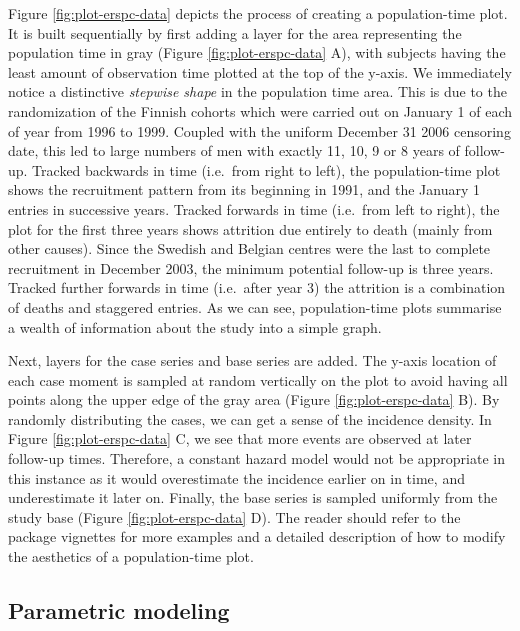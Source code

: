 Figure \ref{fig:plot-erspc-data} depicts the process of creating a
population-time plot. It is built sequentially by first adding a layer
for the area representing the population time in gray (Figure
\ref{fig:plot-erspc-data} A), with subjects having the least amount of
observation time plotted at the top of the y-axis. We immediately notice
a distinctive \emph{stepwise shape} in the population time area. This is
due to the randomization of the Finnish cohorts which were carried out
on January 1 of each of year from 1996 to 1999. Coupled with the uniform
December 31 2006 censoring date, this led to large numbers of men with
exactly 11, 10, 9 or 8 years of follow-up. Tracked backwards in time
(i.e.~from right to left), the population-time plot shows the
recruitment pattern from its beginning in 1991, and the January 1
entries in successive years. Tracked forwards in time (i.e.~from left to
right), the plot for the first three years shows attrition due entirely
to death (mainly from other causes). Since the Swedish and Belgian
centres were the last to complete recruitment in December 2003, the
minimum potential follow-up is three years. Tracked further forwards in
time (i.e.~after year 3) the attrition is a combination of deaths and
staggered entries. As we can see, population-time plots summarise a
wealth of information about the study into a simple graph.

Next, layers for the case series and base series are added. The y-axis
location of each case moment is sampled at random vertically on the plot
to avoid having all points along the upper edge of the gray area (Figure
\ref{fig:plot-erspc-data} B). By randomly distributing the cases, we can
get a sense of the incidence density. In Figure
\ref{fig:plot-erspc-data} C, we see that more events are observed at
later follow-up times. Therefore, a constant hazard model would not be
appropriate in this instance as it would overestimate the incidence
earlier on in time, and underestimate it later on. Finally, the base
series is sampled uniformly from the study base (Figure
\ref{fig:plot-erspc-data} D). The reader should refer to the package
vignettes for more examples and a detailed description of how to modify
the aesthetics of a population-time plot.

\hypertarget{parametric-modeling}{%
\subsection{Parametric modeling}\label{parametric-modeling}}


